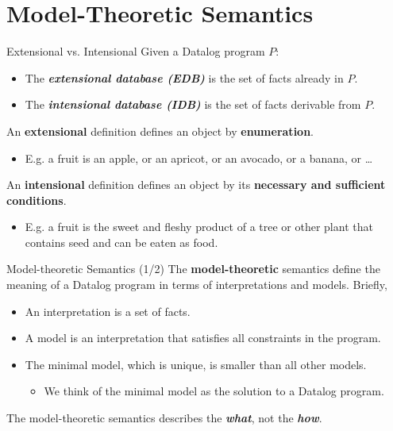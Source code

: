 

\section{Model-Theoretic Semantics}

\begin{frame}{Extensional vs. Intensional}
Given a Datalog program $P$:
\begin{itemize}
    \item The \textbf{\emph{extensional database (EDB)}} is the set of facts
    already in $P$.
    \item The \textbf{\emph{intensional database (IDB)}} is the set of facts
    derivable from $P$.
\end{itemize}

\pause

An \textbf{extensional} definition defines an object by \textbf{enumeration}.
\begin{itemize}
    \item E.g. a fruit is an apple, or an apricot, or an avocado, or a banana, or …
\end{itemize}

\pause

An \textbf{intensional} definition defines an object by its \textbf{necessary
and sufficient conditions}.
\begin{itemize}
    \item E.g. a fruit is the sweet and fleshy product of a tree or other plant that contains seed and can be eaten as food.
\end{itemize}    
\end{frame}

\begin{frame}{Model-theoretic Semantics (1/2)}
The \textbf{model-theoretic} semantics define the meaning of a Datalog program
in terms of interpretations and models. Briefly,
\begin{itemize}
    \item An interpretation is a set of facts.
    \item A model is an interpretation that satisfies all constraints in the program.
    \item The minimal model, which is unique, is smaller than all other models.
        \begin{itemize}
            \item We think of the minimal model as the solution to a Datalog program.
        \end{itemize}
\end{itemize}

\pause

The model-theoretic semantics describes the \textbf{\emph{what}}, not the
\textbf{\emph{how}}.
\end{frame}

